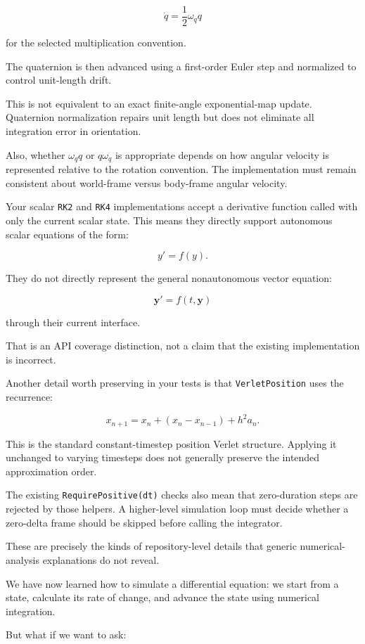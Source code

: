 \[
\dot q=\frac12\omega_q q
\]

for the selected multiplication convention.

The quaternion is then advanced using a first-order Euler step and normalized to control unit-length drift.

This is not equivalent to an exact finite-angle exponential-map update. Quaternion normalization repairs unit length but does not eliminate all integration error in orientation.

Also, whether \(\omega_q q\) or \(q\omega_q\) is appropriate depends on how angular velocity is represented relative to the rotation convention. The implementation must remain consistent about world-frame versus body-frame angular velocity.

Your scalar \texttt{RK2} and \texttt{RK4} implementations accept a derivative function called with only the current scalar state. This means they directly support autonomous scalar equations of the form:

\[
y'=f(y).
\]

They do not directly represent the general nonautonomous vector equation:

\[
\mathbf y'=f(t,\mathbf y)
\]

through their current interface.

That is an API coverage distinction, not a claim that the existing implementation is incorrect.

Another detail worth preserving in your tests is that \texttt{VerletPosition} uses the recurrence:

\[
x_{n+1}=x_n+(x_n-x_{n-1})+h^2a_n.
\]

This is the standard constant-timestep position Verlet structure. Applying it unchanged to varying timesteps does not generally preserve the intended approximation order.

The existing \texttt{RequirePositive(dt)} checks also mean that zero-duration steps are rejected by those helpers. A higher-level simulation loop must decide whether a zero-delta frame should be skipped before calling the integrator.

These are precisely the kinds of repository-level details that generic numerical-analysis explanations do not reveal.

We have now learned how to simulate a differential equation: we start from a state, calculate its rate of change, and advance the state using numerical integration.

But what if we want to ask:

